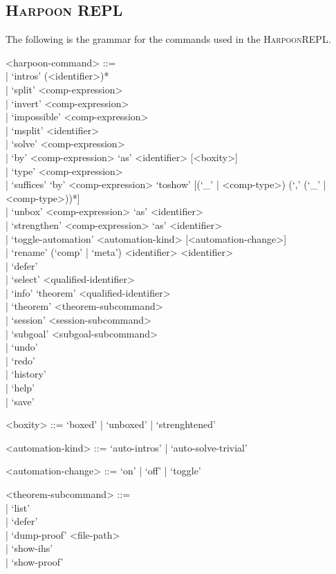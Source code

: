 \documentclass[11pt]{article}
\newcommand{\Harpoon}{\textsc{Harpoon}\xspace}
\begin{document}
\subsection{\Harpoon REPL}\label{section:syntax-harpoon-repl}

The following is the grammar for the commands used in the \Harpoon \ac{REPL}.

\begin{grammar}
<harpoon-command> ::= \hfill\\
| `intros' (<identifier>)*\\
| `split' <comp-expression>\\
| `invert' <comp-expression>\\
| `impossible' <comp-expression>\\
| `msplit' <identifier>\\
| `solve' <comp-expression>\\
| `by' <comp-expression> `as' <identifier> [<boxity>]\\
| `type' <comp-expression>\\
| `suffices' `by' <comp-expression> `toshow' [(`_' | <comp-type>) (`,' (`_' | <comp-type>))*]\\
| `unbox' <comp-expression> `as' <identifier>\\
| `strengthen' <comp-expression> `as' <identifier>\\
| `toggle-automation' <automation-kind> [<automation-change>]\\
| `rename' (`comp' | `meta') <identifier> <identifier>\\
| `defer'\\
| `select' <qualified-identifier>\\
| `info' `theorem' <qualified-identifier>\\
| `theorem' <theorem-subcommand>\\
| `session' <session-subcommand>\\
| `subgoal' <subgoal-subcommand>\\
| `undo'\\
| `redo'\\
| `history'\\
| `help'\\
| `save'

<boxity> ::=
  `boxed'
| `unboxed'
| `strenghtened'

<automation-kind> ::= `auto-intros' | `auto-solve-trivial'

<automation-change> ::= `on' | `off' | `toggle'

<theorem-subcommand> ::= \hfill\\
| `list'\\
| `defer'\\
| `dump-proof' <file-path>\\
| `show-ihs'\\
| `show-proof'


\end{grammar}
\end{document}

